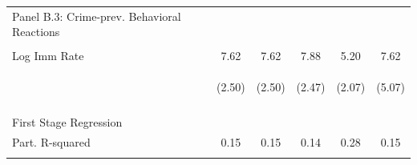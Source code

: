 \begin{center}
\begin{tabular}{lccccc}
\noalign{\smallskip}Panel B.3: Crime-prev. Behavioral Reactions &  &  &  &  & \\
 & \begin{footnotesize}\end{footnotesize} & \begin{footnotesize}\end{footnotesize} & \begin{footnotesize}\end{footnotesize} & \begin{footnotesize}\end{footnotesize} & \begin{footnotesize}\end{footnotesize}\\
\noalign{\smallskip}Log Imm Rate & 7.62 & 7.62 & 7.88 & 5.20 & 7.62\\
 & \begin{footnotesize}(2.50)\end{footnotesize} & \begin{footnotesize}(2.50)\end{footnotesize} & \begin{footnotesize}(2.47)\end{footnotesize} & \begin{footnotesize}(2.07)\end{footnotesize} & \begin{footnotesize}(5.07)\end{footnotesize}\\
\noalign{\smallskip} &  &  &  &  & \\
First Stage Regression & \begin{footnotesize}\end{footnotesize} & \begin{footnotesize}\end{footnotesize} & \begin{footnotesize}\end{footnotesize} & \begin{footnotesize}\end{footnotesize} & \begin{footnotesize}\end{footnotesize}\\
\noalign{\smallskip}Part. R-squared & 0.15 & 0.15 & 0.14 & 0.28 & 0.15\\
 & \begin{footnotesize}\end{footnotesize} & \begin{footnotesize}\end{footnotesize} & \begin{footnotesize}\end{footnotesize} & \begin{footnotesize}\end{footnotesize} & \begin{footnotesize}\end{footnotesize}\\

\end{tabular}
\end{center}
